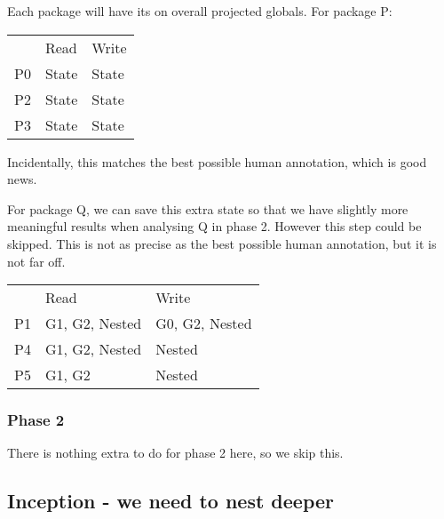 \documentclass{article}
\begin{document}
\noindent
Each package will have its on overall projected globals. For package P:

\begin{center}
  \begin{tabular}{lll}
       & Read           & Write              \\
    P0 & State          & State              \\
    P2 & State          & State              \\
    P3 & State          & State              \\
  \end{tabular}
\end{center}

\noindent
Incidentally, this matches the best possible human annotation, which is
good news.

\pagebreak
\noindent
For package Q, we can save this extra state so that we have slightly more
meaningful results when analysing Q in phase 2. However this step could be
skipped. This is not as precise as the best possible human annotation, but
it is not far off.

\begin{center}
  \begin{tabular}{lll}
       & Read           & Write              \\
    P1 & G1, G2, Nested & G0, G2, Nested     \\
    P4 & G1, G2, Nested & Nested             \\
    P5 & G1, G2         & Nested             \\
  \end{tabular}
\end{center}

\subsubsection{Phase 2}
There is nothing extra to do for phase 2 here, so we skip this.

\newpage
\subsection{Inception - we need to nest deeper}
\end{document}

